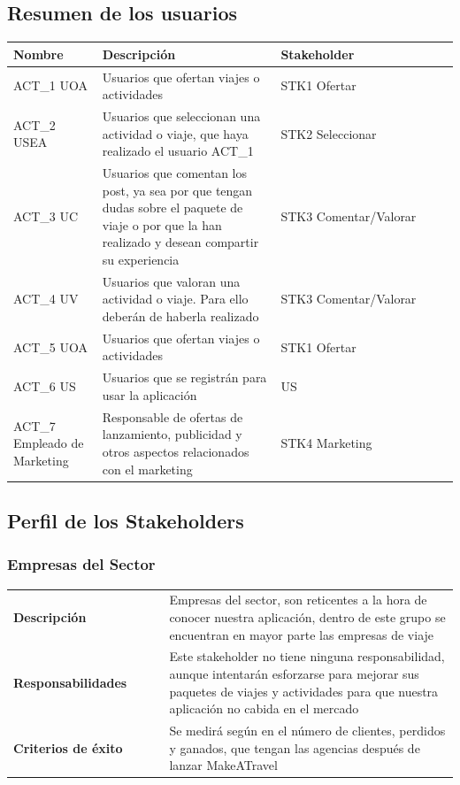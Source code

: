 \documentclass[11pt]{article}
\begin{document}
\subsection{Resumen de los usuarios}
\begin{table}[H]
  \centering
  \begin{tabular}{p{0.2\linewidth}p{0.4\linewidth}p{0.4\linewidth}}
    \toprule
    \textbf{Nombre} & \textbf{Descripción} & \textbf{Stakeholder} \\
    \midrule
    ACT\_1 UOA & Usuarios que ofertan viajes o actividades & STK1 Ofertar\\
    ACT\_2 USEA & Usuarios que seleccionan una actividad o viaje, que haya realizado el usuario ACT\_1 & STK2 Seleccionar\\
    ACT\_3 UC & Usuarios que comentan los post, ya sea por que tengan dudas sobre el paquete de viaje o por que la han realizado y desean compartir su experiencia & STK3 Comentar/Valorar\\
    ACT\_4 UV & Usuarios que valoran una actividad o viaje. Para ello deberán de haberla realizado & STK3 Comentar/Valorar\\
    ACT\_5 UOA & Usuarios que ofertan viajes o actividades & STK1 Ofertar\\
    ACT\_6 US & Usuarios que se registrán para usar la aplicación &US \\
    ACT\_7  Empleado de Marketing & Responsable de ofertas de lanzamiento, publicidad y otros aspectos relacionados con el marketing & STK4 Marketing\\
    \bottomrule
  \end{tabular}
\end{table}

\subsection{Perfil de los Stakeholders}

\subsubsection{Empresas del Sector}
\begin{table}[H]
  \centering
  \begin{tabular}{p{0.35\linewidth}|p{0.65\linewidth}}
    \toprule
       \textbf{Descripción} & Empresas del sector, son reticentes a la hora de conocer nuestra aplicación, dentro de este grupo se encuentran en mayor parte las empresas de viaje\\
    \textbf{Responsabilidades} & Este stakeholder no tiene ninguna responsabilidad, aunque intentarán esforzarse para mejorar sus paquetes de viajes y actividades para que nuestra aplicación no cabida en el mercado\\
    \textbf{Criterios de éxito} & Se medirá según en el número de clientes, perdidos y ganados, que tengan las agencias después de lanzar MakeATravel\\
    \bottomrule
  \end{tabular}
\end{table}
\end{document}
